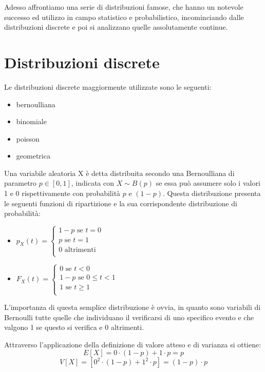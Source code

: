 \documentclass[a4paper,12pt, oneside]{book}
\begin{document}
Adesso affrontiamo una serie di distribuzioni famose, che hanno un notevole successo ed utilizzo in campo
statistico e probabilistico, incominciando dalle distribuzioni discrete e poi si analizzano quelle assolutamente continue.

\section{Distribuzioni discrete}
Le distribuzioni discrete maggiormente utilizzate sono le seguenti:
\begin{itemize}
    \item bernoulliana
    \item binomiale
    \item poisson
    \item geometrica
\end{itemize}
Una variabile aleatoria X è detta distribuita secondo una Bernoulliana di parametro $p\in[0,1]$, indicata con
$X \sim B(p)$ se essa può assumere solo i valori 1 e 0 rispettivamente con probabilità $p$ e $(1 - p)$.\newline
Questa distribuzione presenta le seguenti funzioni di ripartizione e la sua corrispondente distribuzione di probabilità:
\begin{itemize}
    \item $p_X(t) = \begin{cases}
                    1 - p \mbox{ se } t = 0\\
                    p     \mbox{ se } t = 1\\
                    0     \mbox{ altrimenti}\\
                    \end{cases}$
    \item $F_X(t) = \begin{cases}
                    0     \mbox{ se } t < 0\\
                    1 - p \mbox{ se } 0 \leq t < 1\\
                    1     \mbox{ se } t \geq 1\\
                    \end{cases}$
\end{itemize}
L’importanza di questa semplice distribuzione è ovvia, in quanto sono variabili di Bernoulli tutte quelle
che individuano il verificarsi di uno specifico evento e che valgono 1 se questo si verifica e 0 altrimenti.

Attraverso l'applicazione della definizione di valore atteso e di varianza si ottiene:
    \[ E[X] = 0 \cdot (1-p) + 1\cdot p = p\]
    \[ V[X] = [0^2 \cdot (1-p) + 1^2 \cdot p] = (1-p) \cdot p\]
\end{document}
